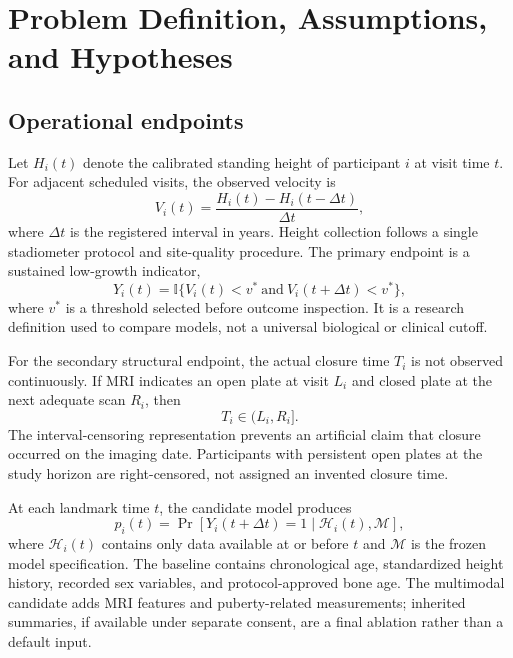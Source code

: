 \documentclass[conference]{IEEEtran}
\newcommand{\indicator}{\mathbb{I}}
\begin{document}
\section{Problem Definition, Assumptions, and Hypotheses}

\subsection{Operational endpoints}

Let $H_i(t)$ denote the calibrated standing height of participant $i$ at visit time $t$. For adjacent scheduled visits, the observed velocity is
\begin{equation}
V_i(t)=\frac{H_i(t)-H_i(t-\Delta t)}{\Delta t},
\label{eq:velocity}
\end{equation}
where $\Delta t$ is the registered interval in years. Height collection follows a single stadiometer protocol and site-quality procedure. The primary endpoint is a sustained low-growth indicator,
\begin{equation}
Y_i(t)=\indicator\{V_i(t)<v^* \ \mathrm{and}\ V_i(t+\Delta t)<v^*\},
\label{eq:primary_endpoint}
\end{equation}
where $v^*$ is a threshold selected before outcome inspection. It is a research definition used to compare models, not a universal biological or clinical cutoff.

For the secondary structural endpoint, the actual closure time $T_i$ is not observed continuously. If MRI indicates an open plate at visit $L_i$ and closed plate at the next adequate scan $R_i$, then
\begin{equation}
T_i \in (L_i,R_i].
\label{eq:interval_censoring}
\end{equation}
The interval-censoring representation prevents an artificial claim that closure occurred on the imaging date. Participants with persistent open plates at the study horizon are right-censored, not assigned an invented closure time.

At each landmark time $t$, the candidate model produces
\begin{equation}
p_i(t)=\Pr\left[Y_i(t+\Delta t)=1 \mid \mathcal{H}_i(t),\mathcal{M}\right],
\label{eq:prediction}
\end{equation}
where $\mathcal{H}_i(t)$ contains only data available at or before $t$ and $\mathcal{M}$ is the frozen model specification. The baseline contains chronological age, standardized height history, recorded sex variables, and protocol-approved bone age. The multimodal candidate adds MRI features and puberty-related measurements; inherited summaries, if available under separate consent, are a final ablation rather than a default input.
\end{document}
